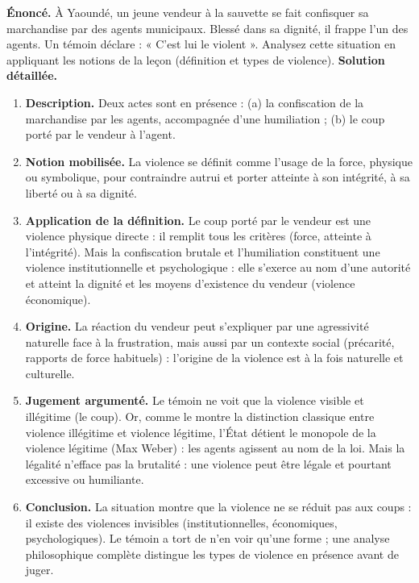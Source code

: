 \documentclass[11pt]{article}
\newcommand{\cle}[1]{{\popxbold\color{popdark}#1}}
\begin{document}
\begin{exoresolu}
\textbf{Énoncé.} À Yaoundé, un jeune vendeur à la sauvette se fait confisquer sa marchandise par des agents municipaux. Blessé dans sa dignité, il frappe l'un des agents. Un témoin déclare : « C'est lui le violent ». Analysez cette situation en appliquant les notions de la leçon (définition et types de violence).
\tcblower
\textbf{Solution détaillée.}
\begin{enumerate}
\item \textbf{Description.} Deux actes sont en présence : (a) la confiscation de la marchandise par les agents, accompagnée d'une humiliation ; (b) le coup porté par le vendeur à l'agent.
\item \textbf{Notion mobilisée.} La violence se définit comme l'usage de la force, physique ou symbolique, pour contraindre autrui et porter atteinte à son intégrité, à sa liberté ou à sa dignité.
\item \textbf{Application de la définition.} Le coup porté par le vendeur est une \cle{violence physique} directe : il remplit tous les critères (force, atteinte à l'intégrité). Mais la confiscation brutale et l'humiliation constituent une \cle{violence institutionnelle et psychologique} : elle s'exerce au nom d'une autorité et atteint la dignité et les moyens d'existence du vendeur (violence économique).
\item \textbf{Origine.} La réaction du vendeur peut s'expliquer par une agressivité naturelle face à la frustration, mais aussi par un contexte social (précarité, rapports de force habituels) : l'origine de la violence est à la fois naturelle et culturelle.
\item \textbf{Jugement argumenté.} Le témoin ne voit que la violence visible et illégitime (le coup). Or, comme le montre la distinction classique entre violence illégitime et violence légitime, l'État détient le monopole de la violence légitime (Max Weber) : les agents agissent au nom de la loi. Mais la légalité n'efface pas la brutalité : une violence peut être légale et pourtant excessive ou humiliante.
\item \textbf{Conclusion.} La situation montre que la violence ne se réduit pas aux coups : il existe des violences invisibles (institutionnelles, économiques, psychologiques). Le témoin a tort de n'en voir qu'une forme ; une analyse philosophique complète distingue les types de violence en présence avant de juger.
\end{enumerate}
\end{exoresolu}
\end{document}
